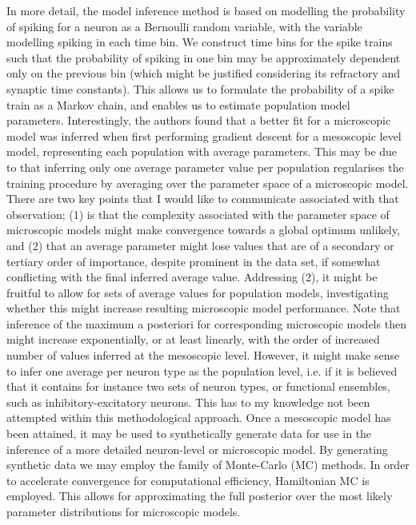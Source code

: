 \documentclass[mphil,deptreport,ianc]{infthesis} %
\begin{document}
In more detail, the model inference method is based on modelling the probability of spiking for a neuron as a Bernoulli random variable, with the variable modelling spiking in each time bin. We construct time bins for the spike trains such that the probability of spiking in one bin may be approximately dependent only on the previous bin (which might be justified considering its refractory and synaptic time constants). This allows us to formulate the probability of a spike train as a Markov chain, and enables us to estimate population model parameters. Interestingly, the authors found that a better fit for a microscopic model was inferred when first performing gradient descent for a mesoscopic level model, representing each population with average parameters. 
This may be due to that inferring only one average parameter value per population regularises the training procedure by averaging over the parameter space of a microscopic model. 
There are two key points that I would like to communicate associated with that observation; (1) is that the complexity associated with the parameter space of microscopic models might make convergence towards a global optimum unlikely, and (2) that an average parameter might lose values that are of a secondary or tertiary order of importance, despite prominent in the data set, if somewhat conflicting with the final inferred average value. Addressing (2), it might be fruitful to allow for sets of average values for population models, investigating whether this might increase resulting microscopic model performance. Note that inference of the maximum a posteriori for corresponding microscopic models then might increase exponentially, or at least linearly, with the order of increased number of values inferred at the mesoscopic level. However, it might make sense to infer one average per neuron type as the population level, i.e. if it is believed that it contains for instance two sets of neuron types, or functional ensembles, such as inhibitory-excitatory neurons. This has to my knowledge not been attempted within this methodological approach.
Once a mesoscopic model has been attained, it may be used to synthetically generate data for use in the inference of a more detailed neuron-level or microscopic model. By generating synthetic data we may employ the family of Monte-Carlo (MC) methods. In order to accelerate convergence for computational efficiency, Hamiltonian MC is employed. This allows for approximating the full posterior over the most likely parameter distributions for microscopic models.
\end{document}
